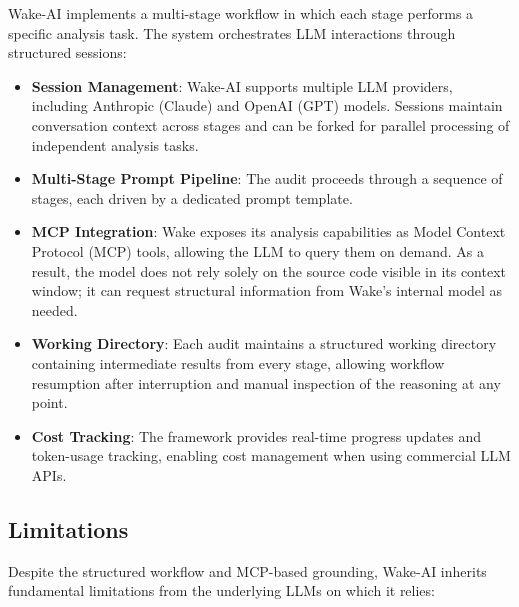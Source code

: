 Wake-AI implements a multi-stage workflow in which each stage performs a specific analysis task. The system orchestrates LLM interactions through structured sessions:

\begin{itemize}
    \item \textbf{Session Management}: Wake-AI supports multiple LLM providers, including Anthropic (Claude) and OpenAI (GPT) models. Sessions maintain conversation context across stages and can be forked for parallel processing of independent analysis tasks.

    \item \textbf{Multi-Stage Prompt Pipeline}: The audit proceeds through a sequence of stages, each driven by a dedicated prompt template.

    \item \textbf{MCP Integration}: Wake exposes its analysis capabilities as Model Context Protocol (MCP) tools, allowing the LLM to query them on demand. As a result, the model does not rely solely on the source code visible in its context window; it can request structural information from Wake's internal model as needed.

    \item \textbf{Working Directory}: Each audit maintains a structured working directory containing intermediate results from every stage, allowing workflow resumption after interruption and manual inspection of the reasoning at any point.

    \item \textbf{Cost Tracking}: The framework provides real-time progress updates and token-usage tracking, enabling cost management when using commercial LLM APIs.
\end{itemize}

\subsection{Limitations}
\label{subsec:wake-ai-limitations}

Despite the structured workflow and MCP-based grounding, Wake-AI inherits fundamental limitations from the underlying LLMs on which it relies:

